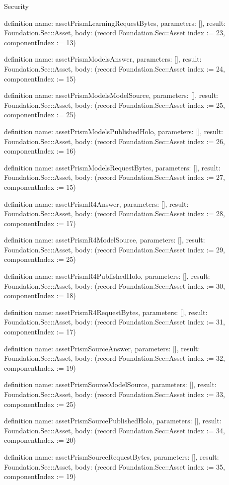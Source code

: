 \begin{lexlean}{Security}
\begin{semanticmodule}
definition{
  name: assetPrismLearningRequestBytes,
  parameters: [],
  result: Foundation.Sec::Asset,
  body: (record Foundation.Sec::Asset {index := 23, componentIndex := 13})
}

definition{
  name: assetPrismModelsAnswer,
  parameters: [],
  result: Foundation.Sec::Asset,
  body: (record Foundation.Sec::Asset {index := 24, componentIndex := 15})
}

definition{
  name: assetPrismModelsModelSource,
  parameters: [],
  result: Foundation.Sec::Asset,
  body: (record Foundation.Sec::Asset {index := 25, componentIndex := 25})
}

definition{
  name: assetPrismModelsPublishedHolo,
  parameters: [],
  result: Foundation.Sec::Asset,
  body: (record Foundation.Sec::Asset {index := 26, componentIndex := 16})
}

definition{
  name: assetPrismModelsRequestBytes,
  parameters: [],
  result: Foundation.Sec::Asset,
  body: (record Foundation.Sec::Asset {index := 27, componentIndex := 15})
}

definition{
  name: assetPrismR4Answer,
  parameters: [],
  result: Foundation.Sec::Asset,
  body: (record Foundation.Sec::Asset {index := 28, componentIndex := 17})
}

definition{
  name: assetPrismR4ModelSource,
  parameters: [],
  result: Foundation.Sec::Asset,
  body: (record Foundation.Sec::Asset {index := 29, componentIndex := 25})
}

definition{
  name: assetPrismR4PublishedHolo,
  parameters: [],
  result: Foundation.Sec::Asset,
  body: (record Foundation.Sec::Asset {index := 30, componentIndex := 18})
}

definition{
  name: assetPrismR4RequestBytes,
  parameters: [],
  result: Foundation.Sec::Asset,
  body: (record Foundation.Sec::Asset {index := 31, componentIndex := 17})
}

definition{
  name: assetPrismSourceAnswer,
  parameters: [],
  result: Foundation.Sec::Asset,
  body: (record Foundation.Sec::Asset {index := 32, componentIndex := 19})
}

definition{
  name: assetPrismSourceModelSource,
  parameters: [],
  result: Foundation.Sec::Asset,
  body: (record Foundation.Sec::Asset {index := 33, componentIndex := 25})
}

definition{
  name: assetPrismSourcePublishedHolo,
  parameters: [],
  result: Foundation.Sec::Asset,
  body: (record Foundation.Sec::Asset {index := 34, componentIndex := 20})
}

definition{
  name: assetPrismSourceRequestBytes,
  parameters: [],
  result: Foundation.Sec::Asset,
  body: (record Foundation.Sec::Asset {index := 35, componentIndex := 19})
}


\end{semanticmodule}
\end{lexlean}
